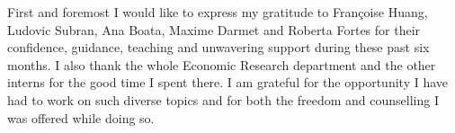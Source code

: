 First and foremost I would like to express my gratitude to Françoise Huang, Ludovic Subran, Ana Boata, Maxime Darmet and Roberta Fortes for their confidence, guidance, teaching and unwavering support during these past six months. 
I also thank the whole Economic Research department and the other interns for the good time I spent there. 
I am grateful for the opportunity I have had to work on such diverse topics and for both the freedom and counselling I was offered while doing so.